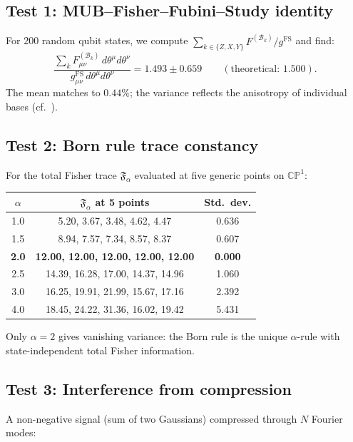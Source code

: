 \documentclass[12pt,a4paper]{article}
\theoremstyle{definition}
\newcommand{\CP}{\mathbb{CP}}
\newcommand{\Bcal}{\mathcal{B}}
\begin{document}
\subsection{Test 1: MUB--Fisher--Fubini--Study identity}

For 200 random qubit states, we compute
$\sum_{k \in \{Z,X,Y\}} F^{(\Bcal_k)} / g^{\mathrm{FS}}$ and find:
\begin{equation}
  \frac{\sum_k F^{(\Bcal_k)}_{\mu\nu}\, d\theta^\mu d\theta^\nu}
       {g^{\mathrm{FS}}_{\mu\nu}\, d\theta^\mu d\theta^\nu}
  = 1.493 \pm 0.659
  \qquad (\text{theoretical: } 1.500).
\end{equation}
The mean matches to $0.44\%$; the variance reflects the anisotropy of
individual bases (cf.\ ).

\subsection{Test 2: Born rule trace constancy}

For the total Fisher trace $\mathfrak{F}_\alpha$ evaluated at five
generic points on $\CP^1$:

\begin{center}
\begin{tabular}{ccc}
\toprule
$\alpha$ & $\mathfrak{F}_\alpha$ at 5 points & Std.\ dev. \\
\midrule
1.0 & 5.20, 3.67, 3.48, 4.62, 4.47 & 0.636 \\
1.5 & 8.94, 7.57, 7.34, 8.57, 8.37 & 0.607 \\
\textbf{2.0} & \textbf{12.00, 12.00, 12.00, 12.00, 12.00} & \textbf{0.000} \\
2.5 & 14.39, 16.28, 17.00, 14.37, 14.96 & 1.060 \\
3.0 & 16.25, 19.91, 21.99, 15.67, 17.16 & 2.392 \\
4.0 & 18.45, 24.22, 31.36, 16.02, 19.42 & 5.431 \\
\bottomrule
\end{tabular}
\end{center}

Only $\alpha = 2$ gives vanishing variance: the Born rule is the unique
$\alpha$-rule with state-independent total Fisher information.

\subsection{Test 3: Interference from compression}

A non-negative signal (sum of two Gaussians) compressed through $N$
Fourier modes:
\end{document}
